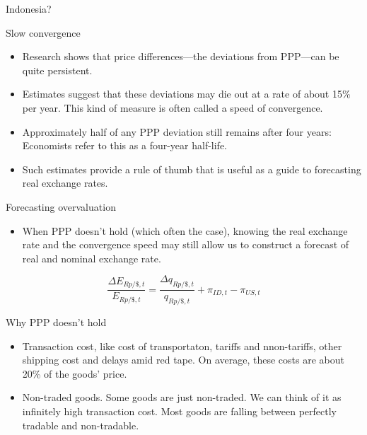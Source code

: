 \documentclass[
  ignorenonframetext,
]{beamer}
\providecommand{\tightlist}{%
  \setlength{\itemsep}{0pt}\setlength{\parskip}{0pt}}\usepackage{longtable,booktabs,array}
\begin{document}
\begin{frame}{Indonesia?}
\begin{figure}
\begin{minipage}{0.50\linewidth}
\begin{figure}[H]
{}


\end{figure}%

\end{minipage}%

\end{figure}%
\end{frame}

\begin{frame}{Slow convergence}
\label{slow-convergence}
\begin{itemize}
\item
  Research shows that price differences---the deviations from PPP---can
  be quite persistent.
\item
  Estimates suggest that these deviations may die out at a rate of about
  15\% per year. This kind of measure is often called a speed of
  convergence.
\item
  Approximately half of any PPP deviation still remains after four
  years: Economists refer to this as a four-year half-life.
\item
  Such estimates provide a rule of thumb that is useful as a guide to
  forecasting real exchange rates.
\end{itemize}
\end{frame}

\begin{frame}{Forecasting overvaluation}
\label{forecasting-overvaluation}
\begin{itemize}
\tightlist
\item
  When PPP doesn't hold (which often the case), knowing the real
  exchange rate and the convergence speed may still allow us to
  construct a forecast of real and nominal exchange rate.
\end{itemize}

\begin{equation}
\frac{\Delta E_{Rp/\$,t}}{E_{Rp/\$,t}}=\frac{\Delta q_{Rp/\$,t}}{q_{Rp/\$,t}}+\pi_{ID,t}-\pi_{US,t}
\end{equation}
\end{frame}

\begin{frame}{Why PPP doesn't hold}
\label{why-ppp-doesnt-hold}
\begin{itemize}
\item
  Transaction cost, like cost of transportaton, tariffs and
  nnon-tariffs, other shipping cost and delays amid red tape. On
  average, these costs are about 20\% of the goods' price.
\item
  Non-traded goods. Some goods are just non-traded. We can think of it
  as infinitely high transaction cost. Most goods are falling between
  perfectly tradable and non-tradable.
\end{itemize}
\end{frame}
\end{document}
